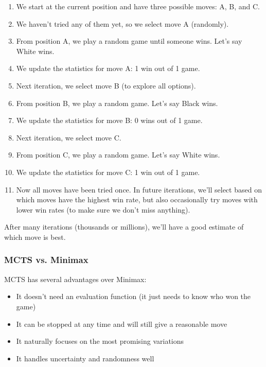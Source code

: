 \documentclass[11pt]{article}
\begin{document}
\begin{enumerate}
    \item We start at the current position and have three possible moves: A, B, and C.

    \item We haven't tried any of them yet, so we select move A (randomly).

    \item From position A, we play a random game until someone wins. Let's say White wins.

    \item We update the statistics for move A: 1 win out of 1 game.

    \item Next iteration, we select move B (to explore all options).

    \item From position B, we play a random game. Let's say Black wins.

    \item We update the statistics for move B: 0 wins out of 1 game.

    \item Next iteration, we select move C.

    \item From position C, we play a random game. Let's say White wins.

    \item We update the statistics for move C: 1 win out of 1 game.

    \item Now all moves have been tried once. In future iterations, we'll select based on which moves have the highest win rate, but also occasionally try moves with lower win rates (to make sure we don't miss anything).
\end{enumerate}

After many iterations (thousands or millions), we'll have a good estimate of which move is best.

\subsubsection{MCTS vs. Minimax}

MCTS has several advantages over Minimax:
\begin{itemize}
    \item It doesn't need an evaluation function (it just needs to know who won the game)
    \item It can be stopped at any time and will still give a reasonable move
    \item It naturally focuses on the most promising variations
    \item It handles uncertainty and randomness well
\end{itemize}
\end{document}
